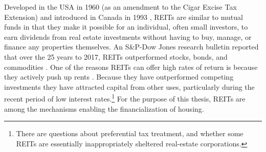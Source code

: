 Developed in the USA  in 1960 (as an amendment to the Cigar Excise Tax Extension) and introduced in Canada in 1993 \cite{GET_REITsDevelopedDates}, REITs are similar to mutual funds in that they make it possible for an individual, often small investors, to earn dividends from real estate investments without having to buy, manage, or finance any properties themselves. 
An S\&P-Dow Jones research bulletin reported that over the 25 years to 2017, REITs outperformed stocks, bonds, and commodities \cite{GET-Dow-Jones-research-bulletin}. One of the reasons REITs can offer high rates of return is because they actively push up rents%
\cite{GET-Martine-August, farhaReportFinancializationHousing2017}. 
 Because they have outperformed competing investments they have attracted capital from other uses, particularly during the recent period of low interest rates.\footnote{There are questions about preferential tax treatment, and whether some REITs are essentially inappropriately sheltered real-estate corporations.} For the purpose of this thesis, REITs are among the mechanisms enabling the financialization of housing.





